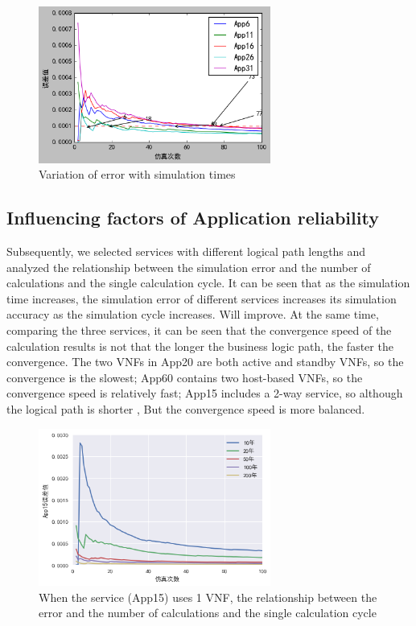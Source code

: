 \documentclass[journal]{IEEEtran}
\begin{document}
    \begin{figure}[!t]
        \begin{center}
            \includegraphics[width = 3in]{img/14.png}
            \caption{Variation of error with simulation times}
            \label{fig10}
        \end{center}
    \end{figure}

    \subsection{Influencing factors of Application reliability}
    Subsequently, we selected services with different logical path lengths and analyzed the relationship between the simulation error and the number of calculations and the single calculation cycle. It can be seen that as the simulation time increases, the simulation error of different services increases its simulation accuracy as the simulation cycle increases. Will improve. At the same time, comparing the three services, it can be seen that the convergence speed of the calculation results is not that the longer the business logic path, the faster the convergence. The two VNFs in App20 are both active and standby VNFs, so the convergence is the slowest; App60 contains two host-based VNFs, so the convergence speed is relatively fast; App15 includes a 2-way service, so although the logical path is shorter  , But the convergence speed is more balanced.


    \begin{figure}[!t]
        \begin{center}
            \includegraphics[width = 3in]{img/15.png}
            \caption{When the service (App15) uses 1 VNF, the relationship between the error and the number of calculations and the single calculation cycle}
            \label{fig10}
        \end{center}
    \end{figure}
\end{document}
